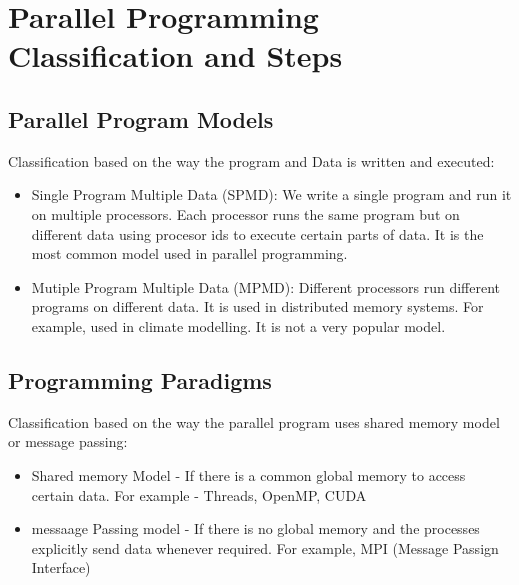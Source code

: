 \documentclass[12pt]{article}
\begin{document}
\newpage

\section{Parallel Programming Classification and Steps}
\subsection{Parallel Program Models}
Classification based on the way the program and Data is written and executed:
\begin{itemize}
    \item Single Program Multiple Data (SPMD): We write a single program and run it on multiple processors. Each processor runs the same program but on different data using procesor ids to execute certain parts of data. It is the most common model used in parallel programming.
    \item Mutiple Program Multiple Data (MPMD): Different processors run different programs on different data. It is used in distributed memory systems. For example, used in climate modelling. It is not a very popular model. 
\end{itemize}
\subsection{Programming Paradigms}
Classification based on the way the parallel program uses shared memory model or message passing:
\begin{itemize}
    \item Shared memory Model - If there is a common global memory to access certain data. For example - Threads, OpenMP, CUDA
    \item messaage Passing model - If there is no global memory and the processes explicitly send data whenever required. For example, MPI (Message Passign Interface)
\end{itemize}
\end{document}
